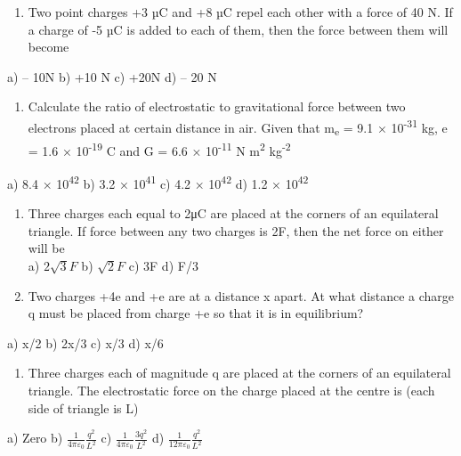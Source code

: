 \begin{enumerate}
\def\labelenumi{\arabic{enumi}.}
\setcounter{enumi}{10}
\item
  Two point charges +3 µC and +8 µC repel each other with a force of 40
  N. If a charge of -5 µC is added to each of them, then the force
  between them will become
\end{enumerate}

a) -- 10N b) +10 N c) +20N d) -- 20 N

\begin{enumerate}
\def\labelenumi{\arabic{enumi}.}
\setcounter{enumi}{11}
\item
  Calculate the ratio of electrostatic to gravitational force between
  two electrons placed at certain distance in air. Given that
  m\textsubscript{e} = 9.1 × 10\textsuperscript{-31} kg, e = 1.6 ×
  10\textsuperscript{-19} C and G = 6.6 × 10\textsuperscript{-11} N
  m\textsuperscript{2} kg\textsuperscript{-2}
\end{enumerate}

a) 8.4 × 10\textsuperscript{42} b) 3.2 × 10\textsuperscript{41} c) 4.2 ×
10\textsuperscript{42} d) 1.2 × 10\textsuperscript{42}

\begin{enumerate}
\def\labelenumi{\arabic{enumi}.}
\setcounter{enumi}{12}
\item
  Three charges each equal to 2μC are placed at the corners of an
  equilateral triangle. If force between any two charges is 2F, then the
  net force on either will be\\
  a) \(2\sqrt{3}F\) b) \(\sqrt{2}F\) c) 3F d) F/3
\item
  Two charges +4e and +e are at a distance x apart. At what distance a
  charge q must be placed from charge +e so that it is in equilibrium?
\end{enumerate}

a) x/2 b) 2x/3 c) x/3 d) x/6

\begin{enumerate}
\def\labelenumi{\arabic{enumi}.}
\setcounter{enumi}{14}
\item
  Three charges each of magnitude q are placed at the corners of an
  equilateral triangle. The electrostatic force on the charge placed at
  the centre is (each side of triangle is L)
\end{enumerate}

a) Zero b) \(\frac{1}{4\pi\varepsilon_{0}}\frac{q^{2}}{L^{2}}\) c)
\(\frac{1}{4\pi\varepsilon_{0}}\frac{3q^{2}}{L^{2}}\) d)
\(\frac{1}{12\pi\varepsilon_{0}}\frac{q^{2}}{L^{2}}\)

